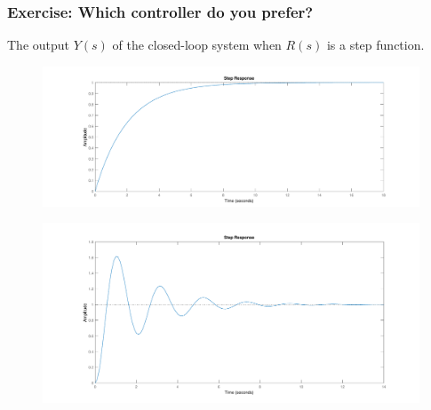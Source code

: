 \begin{frame}
	\frametitle{Exercise: Which controller do you prefer?}
	The output $Y(s)$ of the closed-loop system when $R(s)$ is a step function.
	\begin{figure}
		\centering
		\includegraphics[width=0.7\columnwidth]{smooth-step}
		\label{fig:smooth-step}
	\end{figure}
	\vspace*{-1em}
	\begin{figure}
		\centering
		\includegraphics[width=0.7\columnwidth]{osc-step}
		\label{fig:osc-step}
	\end{figure}
\end{frame}


